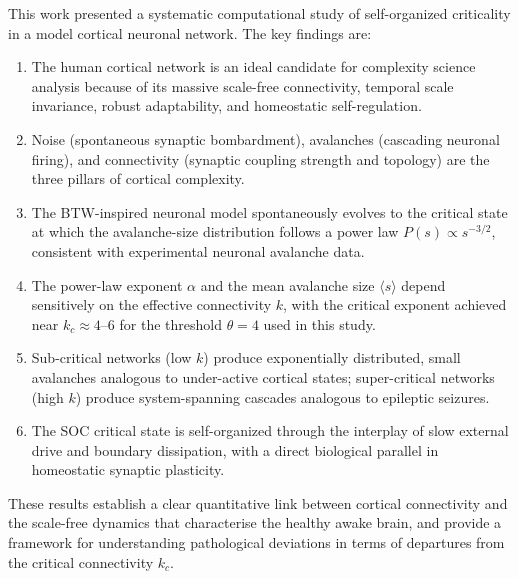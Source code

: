 \documentclass[12pt,a4paper]{article}
\begin{document}
This work presented a systematic computational study of self-organized
criticality in a model cortical neuronal network.  The key findings are:

\begin{enumerate}
  \item The human cortical network is an ideal candidate for complexity
        science analysis because of its massive scale-free connectivity,
        temporal scale invariance, robust adaptability, and
        homeostatic self-regulation.

  \item Noise (spontaneous synaptic bombardment), avalanches (cascading
        neuronal firing), and connectivity (synaptic coupling strength
        and topology) are the three pillars of cortical complexity.

  \item The BTW-inspired neuronal model spontaneously evolves to the
        critical state at which the avalanche-size distribution follows
        a power law $P(s) \propto s^{-3/2}$, consistent with
        experimental neuronal avalanche data.

  \item The power-law exponent $\alpha$ and the mean avalanche size
        $\langle s \rangle$ depend sensitively on the effective
        connectivity $k$, with the critical exponent achieved near
        $k_c \approx 4$--$6$ for the threshold $\theta = 4$ used in
        this study.

  \item Sub-critical networks (low $k$) produce exponentially
        distributed, small avalanches analogous to under-active cortical
        states; super-critical networks (high $k$) produce
        system-spanning cascades analogous to epileptic seizures.

  \item The SOC critical state is self-organized through the interplay
        of slow external drive and boundary dissipation, with a direct
        biological parallel in homeostatic synaptic plasticity.
\end{enumerate}

These results establish a clear quantitative link between cortical
connectivity and the scale-free dynamics that characterise the healthy
awake brain, and provide a framework for understanding pathological
deviations in terms of departures from the critical connectivity $k_c$.

\end{document}
